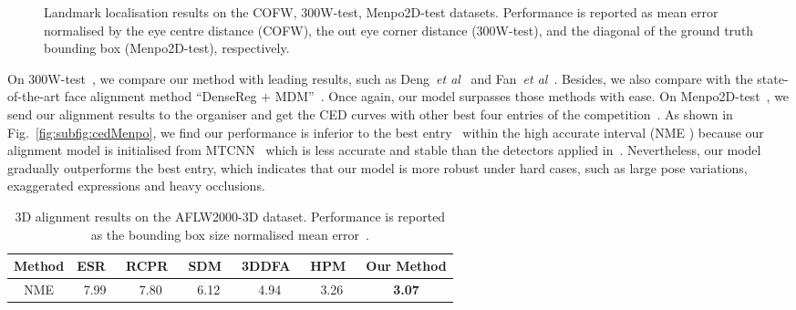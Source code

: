\documentclass{bmvc2k}
\def\etal{\emph{et al}\bmvaOneDot}
\begin{document}
\begin{figure*}[h!]
\centering
{}
\caption{Landmark localisation results on the COFW, 300W-test, Menpo2D-test datasets. Performance is reported as mean error normalised by the eye centre distance (COFW), the out eye corner distance (300W-test), and the diagonal of the ground truth bounding box (Menpo2D-test), respectively.}
\vspace{-4mm}
\label{fig:ced}
\end{figure*}





On 300W-test~\cite{sagonas2016300}, we compare our method with leading results, such as Deng~\etal~\cite{deng2016m} and Fan~\etal~\cite{fan2016approaching}. Besides, we also compare with the state-of-the-art face alignment method ``DenseReg + MDM''~\cite{guler2016densereg}. Once again, our model surpasses those methods with ease. On Menpo2D-test~\cite{stefanos20173Dmenpo}, we send our alignment results to the organiser and get the CED curves with other best four entries of the competition~\cite{stefanos2017menpo}. As shown in Fig.~\ref{fig:subfig:cedMenpo}, we find our performance is inferior to the best entry~\cite{yang2017stacked} within the high accurate interval (NME ) because our alignment model is initialised from MTCNN~\cite{zhang2016joint} which is less accurate and stable than the detectors applied in~\cite{yang2017stacked}. Nevertheless, our model gradually outperforms the best entry, which indicates that our model is more robust under hard cases, such as large pose variations, exaggerated expressions and heavy occlusions. 

\begin{table}[h!]
\begin{center}
\begin{tabular}{c|c|c|c|c|c|c}
\hline
Method  & ESR~\cite{cao2012face} & RCPR~\cite{burgos2013robust} & SDM~\cite{xiong2013supervised} & 3DDFA~\cite{zhu2016face} & HPM~\cite{bulat2017binarized} &  Our Method  \\
\hline
NME   & 7.99   & 7.80  & 6.12  & 4.94  & 3.26 & {\bf 3.07}\\
\hline
\end{tabular}
\end{center}
\vspace{-2mm}
\caption{3D alignment results on the AFLW2000-3D dataset. Performance is reported as the bounding box size normalised mean error~\cite{zhu2016face}.}
\vspace{-6mm}
\label{table:AFLW20003D}
\end{table}
\end{document}
